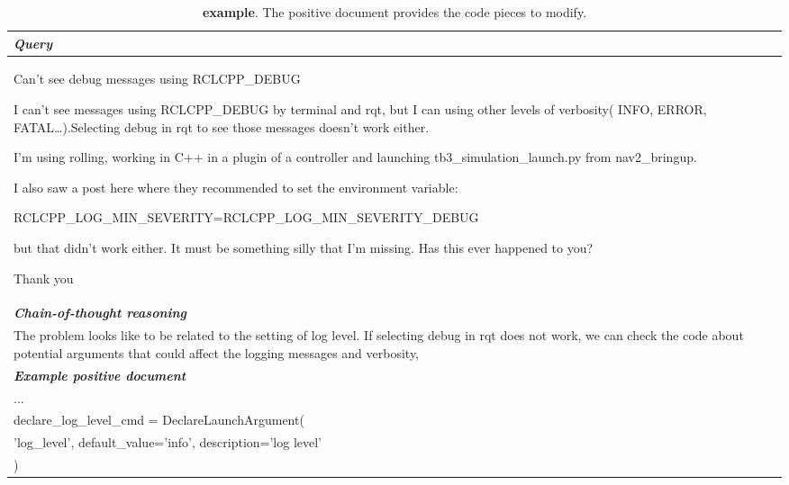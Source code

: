 \begin{table}[ht]
\caption{\textbf{\robotics example}. The positive document provides the code pieces to modify.}
\centering
\begin{tabular}{p{13cm}}
\toprule
\textit{\textbf{Query}} \\
\midrule
Can’t see debug messages using RCLCPP\_DEBUG

I can’t see messages using RCLCPP\_DEBUG by terminal and rqt, but I can using other levels of verbosity( INFO, ERROR, FATAL…).Selecting debug in rqt to see those messages doesn’t work either.

I’m using rolling, working in C++ in a plugin of a controller and launching tb3\_simulation\_launch.py from nav2\_bringup.

I also saw a post here where they recommended to set the environment variable:

RCLCPP\_LOG\_MIN\_SEVERITY=RCLCPP\_LOG\_MIN\_SEVERITY\_DEBUG

but that didn’t work either. It must be something silly that I’m missing. Has this ever happened to you?

Thank you \\
\midrule
\textit{\textbf{Chain-of-thought reasoning}} \\
\midrule
The problem looks like to be related to the setting of log level. If selecting debug in rqt does not work, we can check the code about potential arguments that could affect the logging messages and verbosity,  \\
\midrule
\textit{\textbf{Example positive document}} \\
\midrule
... \\
declare\_log\_level\_cmd = DeclareLaunchArgument( \\
    'log\_level', default\_value='info', description='log level' \\
) \\


\end{tabular}
\end{table}
